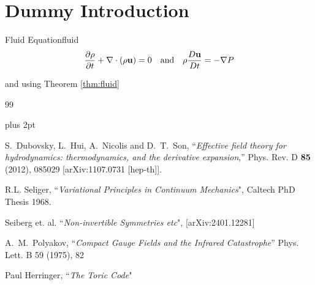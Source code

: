 \documentclass[12pt]{article}        %
\def\be{\begin{eqnarray}}
\def\ee{\end{eqnarray}}
\newcommand{\nn}{\nonumber}
\newcommand{\ppp}[2]{\frac{\partial {#1}}{\partial {#2}}}
\newcommand{\bu}{{\bf u}}
\begin{document}
\newpage
\section{Dummy Introduction}


\begin{theorem}{Fluid Equation}{fluid}
\be \ppp{\rho}{t} + \nabla\cdot({\rho \bu}) = 0\ \ \ {\rm and}\ \ \  \rho\frac{D{\bf u}}{Dt} = -\nabla P\nn\ee
\end{theorem}

and using Theorem \ref{thm:fluid}


\newpage
\begin{thebibliography}{99}

\small
\parskip=0pt plus 2pt


 S.~Dubovsky, L.~Hui, A.~Nicolis and D.~T.~Son,
``{\it Effective field theory for hydrodynamics: thermodynamics, and the derivative expansion},''
Phys. Rev. D \textbf{85} (2012), 085029 [arXiv:1107.0731 [hep-th]].


 R.L. Seliger, ``{\it Variational Principles in Continuum Mechanics}", Caltech PhD Thesis 1968. 

 Seiberg et. al. ``{\it Non-invertible Symmetries etc}", [arXiv:2401.12281]

 A.~M.~Polyakov, ``{\it Compact Gauge Fields and the Infrared Catastrophe}''
Phys. Lett. B 59 (1975), 82

 Paul Herringer, ``{\it The Toric Code}"


\end{thebibliography}
\end{document}
